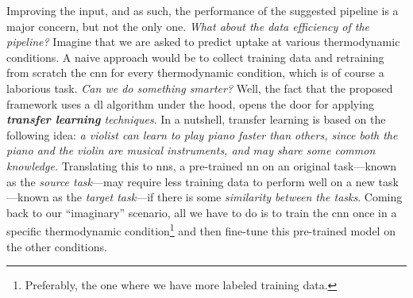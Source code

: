 Improving the input, and as such, the performance of the suggested pipeline is a
major concern, but not the only one. \emph{What about the data
efficiency of the pipeline?} Imagine that we are asked to
predict  uptake at various thermodynamic conditions. A naive approach would be to collect training data and retraining from scratch the \gls{cnn} for every thermodynamic
condition, which is of course a laborious task. \emph{Can we do something
smarter?} Well, the fact that the proposed framework uses a \gls{dl}
algorithm under the hood, opens the door for
applying \emph{\textbf{transfer learning} techniques}.
In a nutshell, transfer learning\parencite{Zhuang2019, Ma2020, Kang2023} is
based on the following idea: \emph{a violist can learn to play piano faster than
others, since both the piano and the violin are musical instruments, and may
share some common knowledge.} Translating this to \glspl{nn}, a pre-trained
\gls{nn} on an original task---known as the \emph{source task}---may require less training data to perform well on a new task---known as
the \emph{target task}---if there is some \emph{similarity between
the tasks}. Coming back to our ``imaginary'' scenario, all we have to do is to
train the \gls{cnn} once in a specific thermodynamic
condition\footnote{Preferably, the one where we have more labeled training
data.} and then fine-tune this pre-trained
model on the other conditions.

